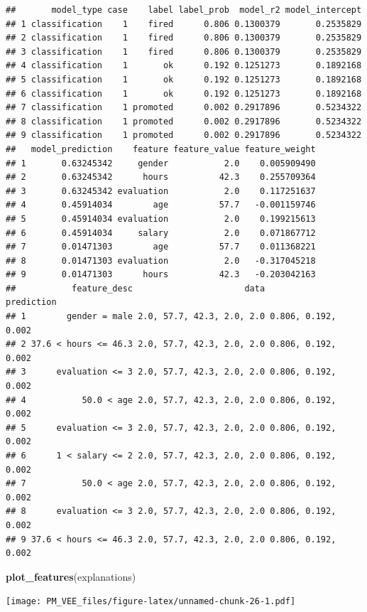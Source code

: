 \documentclass[]{krantz}
\newenvironment{Shaded}{\begin{snugshade}}{\end{snugshade}}
\newcommand{\KeywordTok}[1]{\textcolor[rgb]{0.13,0.29,0.53}{\textbf{#1}}}
\newcommand{\NormalTok}[1]{#1}
\theoremstyle{definition}
\theoremstyle{definition}
\theoremstyle{definition}
\theoremstyle{remark}
\begin{document}
\begin{verbatim}
##       model_type case    label label_prob  model_r2 model_intercept
## 1 classification    1    fired      0.806 0.1300379       0.2535829
## 2 classification    1    fired      0.806 0.1300379       0.2535829
## 3 classification    1    fired      0.806 0.1300379       0.2535829
## 4 classification    1       ok      0.192 0.1251273       0.1892168
## 5 classification    1       ok      0.192 0.1251273       0.1892168
## 6 classification    1       ok      0.192 0.1251273       0.1892168
## 7 classification    1 promoted      0.002 0.2917896       0.5234322
## 8 classification    1 promoted      0.002 0.2917896       0.5234322
## 9 classification    1 promoted      0.002 0.2917896       0.5234322
##   model_prediction    feature feature_value feature_weight
## 1       0.63245342     gender           2.0    0.005909490
## 2       0.63245342      hours          42.3    0.255709364
## 3       0.63245342 evaluation           2.0    0.117251637
## 4       0.45914034        age          57.7   -0.001159746
## 5       0.45914034 evaluation           2.0    0.199215613
## 6       0.45914034     salary           2.0    0.071867712
## 7       0.01471303        age          57.7    0.011368221
## 8       0.01471303 evaluation           2.0   -0.317045218
## 9       0.01471303      hours          42.3   -0.203042163
##           feature_desc                      data          prediction
## 1        gender = male 2.0, 57.7, 42.3, 2.0, 2.0 0.806, 0.192, 0.002
## 2 37.6 < hours <= 46.3 2.0, 57.7, 42.3, 2.0, 2.0 0.806, 0.192, 0.002
## 3      evaluation <= 3 2.0, 57.7, 42.3, 2.0, 2.0 0.806, 0.192, 0.002
## 4           50.0 < age 2.0, 57.7, 42.3, 2.0, 2.0 0.806, 0.192, 0.002
## 5      evaluation <= 3 2.0, 57.7, 42.3, 2.0, 2.0 0.806, 0.192, 0.002
## 6      1 < salary <= 2 2.0, 57.7, 42.3, 2.0, 2.0 0.806, 0.192, 0.002
## 7           50.0 < age 2.0, 57.7, 42.3, 2.0, 2.0 0.806, 0.192, 0.002
## 8      evaluation <= 3 2.0, 57.7, 42.3, 2.0, 2.0 0.806, 0.192, 0.002
## 9 37.6 < hours <= 46.3 2.0, 57.7, 42.3, 2.0, 2.0 0.806, 0.192, 0.002
\end{verbatim}

\begin{Shaded}
\begin{Highlighting}[]
\KeywordTok{plot_features}\NormalTok{(explanations)}
\end{Highlighting}
\end{Shaded}

\texttt{[image: PM\_VEE\_files/figure-latex/unnamed-chunk-26-1.pdf]}
\end{document}
